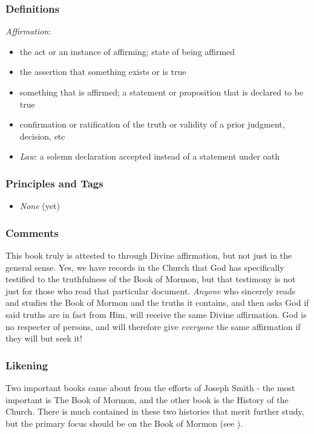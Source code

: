 \documentclass[12pt]{report}
\begin{document}
\subsubsection{Definitions\label{js:DFNFinal}}
\emph{Affirmation}: \begin{itemize}
\item the act or an instance of affirming; state of being affirmed
\item the assertion that something exists or is true
\item something that is affirmed; a statement or proposition that is declared to be true
\item confirmation or ratification of the truth or validity of a prior judgment, decision, etc
\item \emph{Law}: a solemn declaration accepted instead of a statement under oath
\end{itemize}

\subsubsection{Principles and Tags\label{js:principlesFinal}}
\begin{itemize}
\item \index{}\emph{None} (yet)
\end{itemize}

\subsubsection{Comments\label{js:commentsFinal}}
This book truly is attested to through Divine affirmation, but not just in the general sense.  Yes, we have records in the Church that God has specifically testified to the truthfulness of the Book of Mormon, but that testimony is not just for those who read that particular document.  \emph{Anyone} who sincerely reads and studies the Book of Mormon and the truths it contains, and then asks God if said truths are in fact from Him, will receive the same Divine affirmation.  God is no respecter of persons, and will therefore give \emph{everyone} the same affirmation if they will but seek it!

\subsubsection{Likening\label{js:likeningFinal}}
Two important books came about from the efforts of Joseph Smith - the most important is The Book of Mormon, and the other book is the History of the Church.  There is much contained in these two histories that merit further study, but the primary focus should be on the Book of Mormon (see ).
\end{document}
